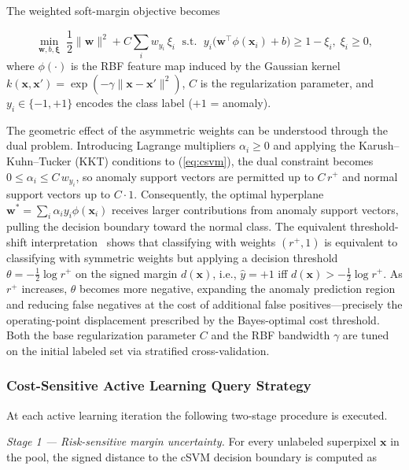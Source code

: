 \documentclass[lettersize,journal]{IEEEtran}
\begin{document}
\noindent The weighted soft-margin objective becomes

{\small
\begin{equation}
    \min_{\mathbf{w},b,\boldsymbol{\xi}}\;
    \frac{1}{2}\|\mathbf{w}\|^{2}
    + C\!\sum_{i} w_{y_i}\,\xi_i
    \;\text{ s.t. }\;
    y_i\bigl(\mathbf{w}^{\!\top}\phi(\mathbf{x}_i)+b\bigr)
    \geq 1-\xi_i,\;\xi_i\geq 0,
    \label{eq:csvm}
\end{equation}
}
\noindent where $\phi(\cdot)$ is the RBF feature map induced by the
Gaussian kernel $k(\mathbf{x},\mathbf{x}') =
\exp(-\gamma\|\mathbf{x}-\mathbf{x}'\|^{2})$, $C$ is the
regularization parameter, and $y_i \in \{-1,+1\}$ encodes the class
label ($+1$ = anomaly).

The geometric effect of the asymmetric weights can be understood
through the dual problem. Introducing Lagrange multipliers
$\alpha_i \geq 0$ and applying the Karush--Kuhn--Tucker (KKT) conditions to
(\ref{eq:csvm}), the dual constraint becomes $0 \leq \alpha_i \leq
C\,w_{y_i}$, so anomaly support vectors are permitted up to $C\,r^{+}$
and normal support vectors up to $C\cdot 1$. Consequently, the optimal
hyperplane $\mathbf{w}^{*} = \sum_i \alpha_i y_i \phi(\mathbf{x}_i)$
receives larger contributions from anomaly support vectors, pulling
the decision boundary toward the normal class. The equivalent
threshold-shift interpretation~\cite{veropoulos1999controlling}
shows that classifying with weights $(r^{+},1)$ is equivalent to
classifying with symmetric weights but applying a decision threshold
$\theta = -\tfrac{1}{2}\log r^{+}$ on the signed margin $d(\mathbf{x})$,
i.e., $\hat{y} = +1$ iff $d(\mathbf{x}) > -\tfrac{1}{2}\log r^{+}$.
As $r^{+}$ increases, $\theta$ becomes more negative, expanding the
anomaly prediction region and reducing false negatives at the cost of
additional false positives---precisely the operating-point
displacement prescribed by the Bayes-optimal cost
threshold. Both the base regularization parameter $C$ and the RBF
bandwidth $\gamma$ are tuned on the initial labeled set via stratified
cross-validation.

\subsubsection{Cost-Sensitive Active Learning Query Strategy}

At each active learning iteration the following two-stage procedure
is executed.

\textit{Stage 1 — Risk-sensitive margin uncertainty.}
For every unlabeled superpixel $\mathbf{x}$ in the pool, the signed
distance to the cSVM decision boundary is computed as
\end{document}
